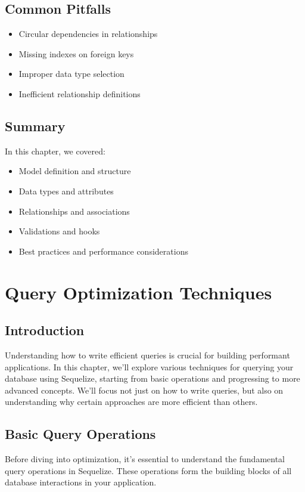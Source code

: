 \documentclass[12pt,a4paper]{book}
\begin{document}
	\section{Common Pitfalls}
	
	\begin{itemize}
		\item Circular dependencies in relationships
		\item Missing indexes on foreign keys
		\item Improper data type selection
		\item Inefficient relationship definitions
	\end{itemize}
	
	\section{Summary}
	In this chapter, we covered:
	\begin{itemize}
		\item Model definition and structure
		\item Data types and attributes
		\item Relationships and associations
		\item Validations and hooks
		\item Best practices and performance considerations
	\end{itemize}
	
	\chapter{Query Optimization Techniques}
	
	\section{Introduction}
	Understanding how to write efficient queries is crucial for building performant applications. In this chapter, we'll explore various techniques for querying your database using Sequelize, starting from basic operations and progressing to more advanced concepts. We'll focus not just on how to write queries, but also on understanding why certain approaches are more efficient than others.
	
	\section{Basic Query Operations}
	Before diving into optimization, it's essential to understand the fundamental query operations in Sequelize. These operations form the building blocks of all database interactions in your application.
	
\end{document}
